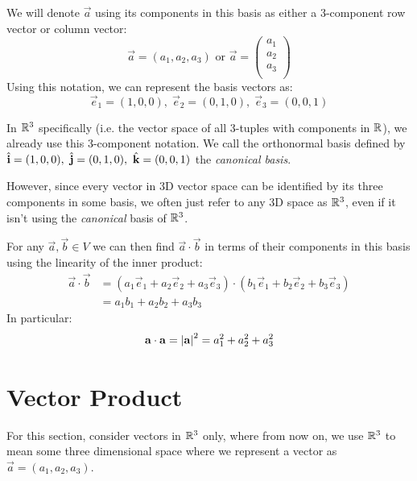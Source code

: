 \documentclass[../main.tex]{subfiles}
\begin{document}
We will denote $\vec{a}$ using its components in this basis as either a 3-component row vector or column vector:
\[
  \vec{a} = (a_1, a_2, a_3) \text{ or } \vec{a} =
  \begin{pmatrix}
  a_1 \\
  a_2 \\
  a_3 \\
  \end{pmatrix}
\]
Using this notation, we can represent the basis vectors as:
\[
  \vec{e}_1 = (1, 0, 0),\; \vec{e}_2 = (0, 1, 0),\; \vec{e}_3 = (0, 0, 1)
\]
\begin{remark} \label{canonicalBasisRemark}
  In $\mathbb{R}^3$ specifically (i.e. the vector space of all 3-tuples with components in $\mathbb{R}$), we already use this 3-component notation.
  We call the orthonormal basis defined by $\uvec{i} = (1, 0, 0),\ \uvec{j} = (0, 1, 0),\ \uvec{k} = (0, 0, 1)$ the \textit{canonical basis}.

  However, since every vector in 3D vector space can be identified by its three components in some basis, we often just refer to any 3D space as $\mathbb{R}^3$, even if it isn't using the \textit{canonical} basis of $\mathbb{R}^3$.
\end{remark}
For any $\vec{a}, \vec{b}\in V$ we can then find $\vec{a} \cdot \vec{b}$ in terms of their components in this basis using the linearity of the inner product:
\begin{align*}
  \vec{a} \cdot \vec{b} &= (a_1 \vec{e}_1 + a_2 \vec{e}_2 + a_3 \vec{e}_3) \cdot (b_1 \vec{e}_1 + b_2 \vec{e}_2 + b_3 \vec{e}_3) \\
                        &= a_1 b_1 + a_2 b_2 + a_3 b_3
\end{align*}
In particular:
\[
  \mathbf{\bm{a}} \cdot \mathbf{\bm{a}} = \left\lvert \mathbf{\bm{a}} \right\rvert^2 = a^{2}_{1} + a^{2}_{2} + a^{2}_{3}
\]
\section{Vector Product}
\begin{remark}[Note]
For this section, consider vectors in $\mathbb{R}^{3}$ only, where from now on, we use $\mathbb{R}^3$ to mean some three dimensional space where we represent a vector as $\vec{a} = (a_1, a_2, a_3)$.
\end{remark}
\end{document}
